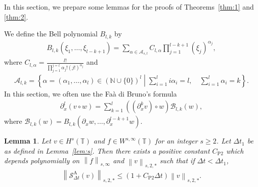 \documentclass[10pt,a4paper,tbtags,leqno]{amsart}
\newtheorem{lemma}[theorem]{Lemma}
\theoremstyle{definition}
\numberwithin{equation}{section}
\def\norm#1#2{\left\|#2\right\|_{#1}}
\newcommand{\relmiddle}{\mathrel{}\middle|\mathrel{}}
\begin{document}
In this section, we prepare some lemmas for the proofs of Theorems~\ref{thm:1} and \ref{thm:2}. 

We define the Bell polynomial $ B_{l, k} $ by 
\begin{align} 
  B_{l, k} (\xi_1, \ldots, \xi_{l - k + 1}) = \sum_{\alpha \in \mathcal{A}_{s,l}} C_{l,\alpha} \prod_{j = 1}^{l - k + 1} \left(\xi_j \right)^{\alpha_j}, 
\end{align} 
where $ C_{l,\alpha} = \frac{l!}{\prod_{j=1}^{j=l}\alpha_j! (j!)^{\alpha_j}} $ and 
\begin{align} 
  \mathcal{A}_{l, k} = \left\{\alpha = (\alpha_1, \ldots, \alpha_l) \in (\mathbb{N}\cup \{0\})^l \relmiddle \sum_{i=1}^{l} i \alpha_i = l, \quad \sum_{i=1}^{l} \alpha_i = k \right\}. 
\end{align} 
In this section, we often use the Fa\`a di Bruno's formula
\begin{align}
  \partial_x^l (v \circ w) = \sum_{k = 1}^{l} \left((\partial_x^k v) \circ w\right) \mathcal{B}_{l, k} (w), \label{fdb}
\end{align} 
where $ \mathcal{B}_{l, k} (w) = B_{l, k} (\partial_x w, \ldots, \partial_x^{l - k + 1} w) $. 

\begin{lemma} \label{lem:s2} 
  Let $ v \in H^s (\mathbb{T}) $ and $ f \in W^{s, \infty} (\mathbb{T}) $ for an integer $ s \geq 2 $. Let $ \Delta t_1 $ be as defined in Lemma~\ref{lem:s}. Then there exists a positive constant $ C_{\mathrm{P}2} $ which depends polynomially on $ \norm{s, \infty}{f} $ and $ \norm{s,2,\ast}{v} $ such that if $ \Delta t < \Delta t_1 $, 
  \begin{align} 
    \norm{s,2,\ast}{\mathcal{S}_{\Delta t}^{\mathrm{A}} (v)} \leq \left(1 + C_{\mathrm{P}2} \Delta t \right) \norm{s,2,\ast} {v}. \label{a2} 
  \end{align} 
\end{lemma} 
\end{document}
